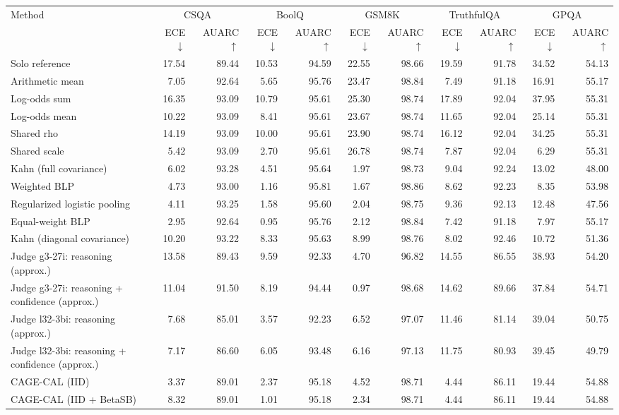 \begin{tabular}{lrrrrrrrrrr}
\toprule
Method & \multicolumn{2}{c}{CSQA} & \multicolumn{2}{c}{BoolQ} & \multicolumn{2}{c}{GSM8K} & \multicolumn{2}{c}{TruthfulQA} & \multicolumn{2}{c}{GPQA} \\
 & ECE $\downarrow$ & AUARC $\uparrow$ & ECE $\downarrow$ & AUARC $\uparrow$ & ECE $\downarrow$ & AUARC $\uparrow$ & ECE $\downarrow$ & AUARC $\uparrow$ & ECE $\downarrow$ & AUARC $\uparrow$ \\
\midrule
Solo reference & 17.54 & 89.44 & 10.53 & 94.59 & 22.55 & 98.66 & 19.59 & 91.78 & 34.52 & 54.13 \\
Arithmetic mean & 7.05 & 92.64 & 5.65 & 95.76 & 23.47 & 98.84 & 7.49 & 91.18 & 16.91 & 55.17 \\
Log-odds sum & 16.35 & 93.09 & 10.79 & 95.61 & 25.30 & 98.74 & 17.89 & 92.04 & 37.95 & 55.31 \\
Log-odds mean & 10.22 & 93.09 & 8.41 & 95.61 & 23.67 & 98.74 & 11.65 & 92.04 & 25.14 & 55.31 \\
Shared rho & 14.19 & 93.09 & 10.00 & 95.61 & 23.90 & 98.74 & 16.12 & 92.04 & 34.25 & 55.31 \\
Shared scale & 5.42 & 93.09 & 2.70 & 95.61 & 26.78 & 98.74 & 7.87 & 92.04 & 6.29 & 55.31 \\
Kahn (full covariance) & 6.02 & 93.28 & 4.51 & 95.64 & 1.97 & 98.73 & 9.04 & 92.24 & 13.02 & 48.00 \\
Weighted BLP & 4.73 & 93.00 & 1.16 & 95.81 & 1.67 & 98.86 & 8.62 & 92.23 & 8.35 & 53.98 \\
Regularized logistic pooling & 4.11 & 93.25 & 1.58 & 95.60 & 2.04 & 98.75 & 9.36 & 92.13 & 12.48 & 47.56 \\
Equal-weight BLP & 2.95 & 92.64 & 0.95 & 95.76 & 2.12 & 98.84 & 7.42 & 91.18 & 7.97 & 55.17 \\
Kahn (diagonal covariance) & 10.20 & 93.22 & 8.33 & 95.63 & 8.99 & 98.76 & 8.02 & 92.46 & 10.72 & 51.36 \\
Judge g3-27i: reasoning (approx.) & 13.58 & 89.43 & 9.59 & 92.33 & 4.70 & 96.82 & 14.55 & 86.55 & 38.93 & 54.20 \\
Judge g3-27i: reasoning + confidence (approx.) & 11.04 & 91.50 & 8.19 & 94.44 & 0.97 & 98.68 & 14.62 & 89.66 & 37.84 & 54.71 \\
Judge l32-3bi: reasoning (approx.) & 7.68 & 85.01 & 3.57 & 92.23 & 6.52 & 97.07 & 11.46 & 81.14 & 39.04 & 50.75 \\
Judge l32-3bi: reasoning + confidence (approx.) & 7.17 & 86.60 & 6.05 & 93.48 & 6.16 & 97.13 & 11.75 & 80.93 & 39.45 & 49.79 \\
CAGE-CAL (IID) & 3.37 & 89.01 & 2.37 & 95.18 & 4.52 & 98.71 & 4.44 & 86.11 & 19.44 & 54.88 \\
CAGE-CAL (IID + BetaSB) & 8.32 & 89.01 & 1.01 & 95.18 & 2.34 & 98.71 & 4.44 & 86.11 & 19.44 & 54.88 \\
\bottomrule
\end{tabular}
